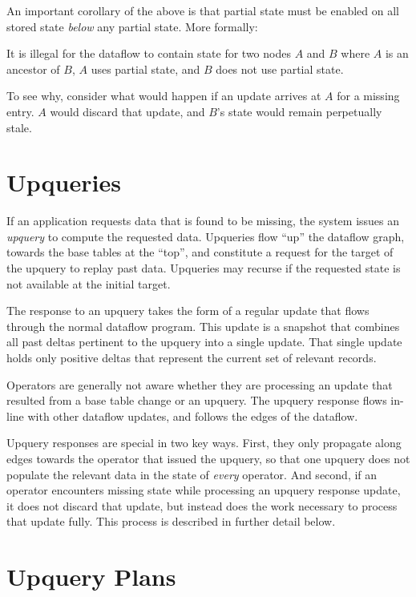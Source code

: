 An important corollary of the above is that partial state must be enabled
on all stored state \emph{below} any partial state. More formally:

\begin{invariant}
  \label{i:partial-above-full}
  It is illegal for the dataflow to contain state for two nodes $A$ and $B$
  where $A$ is an ancestor of $B$, $A$ uses partial state, and $B$ does not use
  partial state.
\end{invariant}

To see why, consider what would happen if an update arrives at $A$ for a missing
entry. $A$ would discard that update, and $B$'s state would remain perpetually
stale.

\section{Upqueries}

If an application requests data that is found to be missing, the system issues
an \textit{upquery} to compute the requested data. Upqueries flow ``up'' the
dataflow graph, towards the base tables at the ``top'', and constitute a request
for the target of the upquery to replay past data. Upqueries may recurse if the
requested state is not available at the initial target.

The response to an upquery takes the form of a regular update that flows through
the normal dataflow program. This update is a snapshot that combines all past
deltas pertinent to the upquery into a single update. That single update holds
only positive deltas that represent the current set of relevant records.

Operators are generally not aware whether they are processing an update that
resulted from a base table change or an upquery. The upquery response flows
in-line with other dataflow updates, and follows the edges of the dataflow.

Upquery responses are special in two key ways. First, they only propagate along
edges towards the operator that issued the upquery, so that one upquery does not
populate the relevant data in the state of \emph{every} operator. And second,
if an operator encounters missing state while processing an upquery response
update, it does not discard that update, but instead does the work necessary to
process that update fully. This process is described in further detail below.

\section{Upquery Plans}


